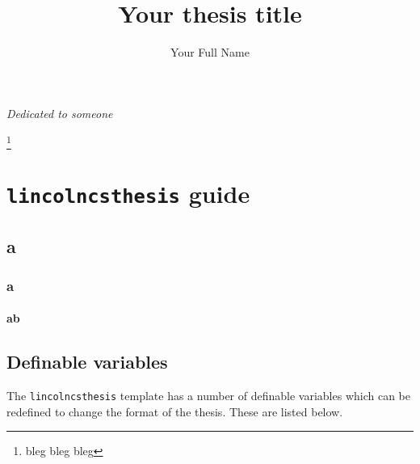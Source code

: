\documentclass[harvard]{lincolncsthesis}
\title{\bfseries Your thesis title}
\author{Your Full Name}
\begin{document}


\begin{blankpage}
\itshape Dedicated to someone
\end{blankpage}

\begin{acknowledgements}
\blindtext
\blindtext

\footnote{bleg bleg bleg}
\end{acknowledgements}


\begin{abstract}
\blindtext
\end{abstract}

\thesisTables
\thesisBodyStart

\chapter{\texttt{lincolncsthesis} guide}

\section{a}
\subsection{a}
\subsubsection{ab}

\section{Definable variables}
The \texttt{lincolncsthesis} template has a number of definable variables which can be redefined to change the format of the thesis. These are listed below.
\end{document}
